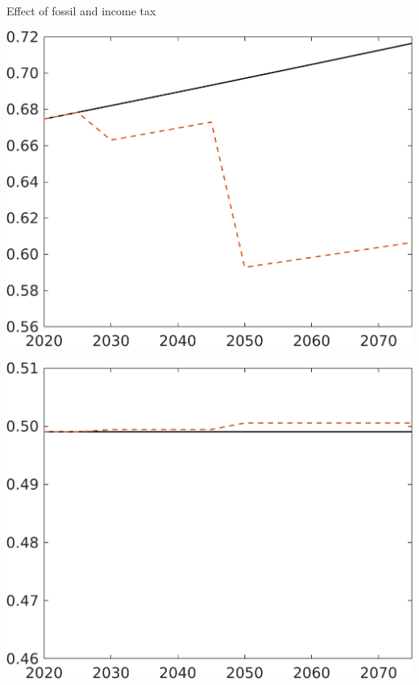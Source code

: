 \documentclass[11pt,aspectratio=169]{beamer}
\begin{document}
\begin{frame}{Effect of fossil and income tax}
	\centering
	\begin{minipage}[]{0.3\textwidth}
		\includegraphics[width=1\textwidth]{../codding_model/own_basedOnFried/optimalPol_elastS_DisuSci/figures/all_1705/CompCounterFac_withLF_noopt_taufopt1_taulopt0_C_spillover0_noskill0_sep1_BN0_ineq0_red0_xgrowth0_etaa0.79_lgd0.png}
	\end{minipage}
	\begin{minipage}[]{0.3\textwidth}
		\includegraphics[width=1\textwidth]{../codding_model/own_basedOnFried/optimalPol_elastS_DisuSci/figures/all_1705/CompCounterFac_withLF_noopt_taufopt1_taulopt0_hh_spillover0_noskill0_sep1_BN0_ineq0_red0_xgrowth0_etaa0.79_lgd0.png}

\end{minipage}
\end{frame}
\end{document}
